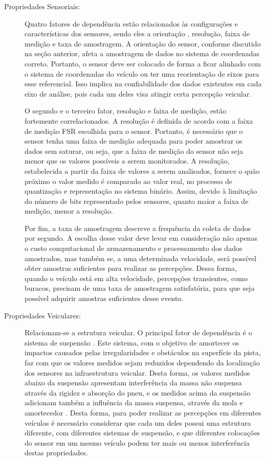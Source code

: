 \begin{description}
	
	\item [Propriedades Sensoriais:] 
	
	Quatro fatores de dependência estão relacionados às configurações e características dos sensores, sendo eles a orientação \cite{Kumar2017,Alam2020}, resolução, faixa de medição e taxa de amostragem. A orientação do sensor, conforme discutido na seção anterior, afeta a amostragem de dados no sistema de coordenadas correto. Portanto, o sensor deve ser colocado de forma a ficar alinhado com o sistema de coordenadas do veículo ou ter uma reorientação de eixos para esse referencial. Isso implica na confiabilidade dos dados existentes em cada eixo de análise, pois cada um deles visa atingir certa percepção veicular.

	O segundo e o terceiro fator, resolução e faixa de medição, estão fortemente correlacionados. A resolução é definida de acordo com a faixa de medição FSR escolhida para o sensor. Portanto, é necessário que o sensor tenha uma faixa de medição adequada para poder amostrar os dados sem saturar, ou seja, que a faixa de medição do sensor não seja menor que os valores possíveis a serem monitorados. A resolução, estabelecida a partir da faixa de valores a serem analisados, fornece o quão próximo o valor medido é comparado ao valor real, no processo de quantização e representação no sistema binário. Assim, devido à limitação do número de bits representado pelos sensores, quanto maior a faixa de medição, menor a resolução.
	
	Por fim, a taxa de amostragem descreve a frequência da coleta de dados por segundo. A escolha desse valor deve levar em consideração não apenas o custo computacional de armazenamento e processamento dos dados amostrados, mas também se, a uma determinada velocidade, será possível obter amostras suficientes para realizar as percepções. Dessa forma, quando o veículo está em alta velocidade, percepções transientes, como buracos, precisam de uma taxa de amostragem satisfatória, para que seja possível adquirir amostras suficientes desse evento.
	
	\item [Propriedades Veiculares:] 
	
	Relacionam-se a estrutura veicular. O principal fator de dependência é o sistema de suspensão \cite{Kumar2017, Wickramarathne2018,Alam2020}. Este sistema, com o objetivo de amortecer os impactos causados pelas irregularidades e obstáculos na superfície da pista, faz com que os valores medidos sejam reduzidos dependendo da localização dos sensores na infraestrutura veicular. Desta forma, os valores medidos abaixo da suspensão apresentam interferência da massa não suspensa através da rigidez e absorção do pneu, e os medidos acima da suspensão adicionam também a influência da massa suspensa, através da mola e amortecedor \cite{Yafeai2019}. Desta forma, para poder realizar as percepções em diferentes veículos é necessário considerar que cada um deles possui uma estrutura diferente, com diferentes sistemas de suspensão, e que diferentes colocações do sensor em um mesmo veículo podem ter mais ou menos interferência destas propriedades.


\end{description}
